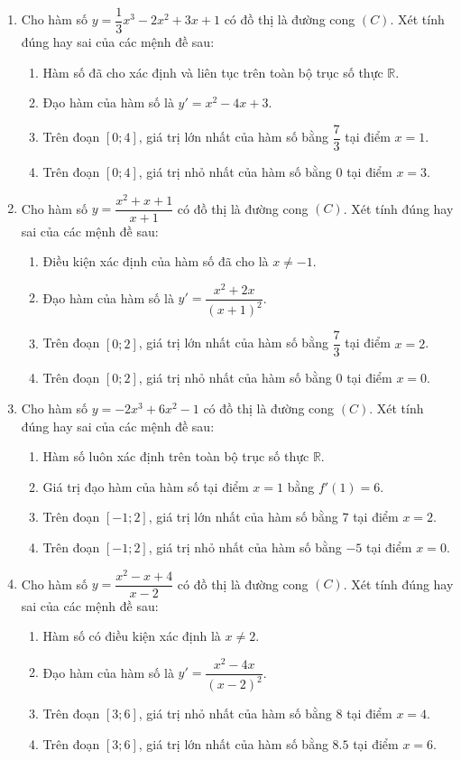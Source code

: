 \documentclass[12pt]{article}
\begin{document}
\begin{enumerate}[label=\textbf{Câu \arabic*.}]
		\item Cho hàm số $y = \dfrac{1}{3}x^3 - 2x^2 + 3x + 1$ có đồ thị là đường cong $(C)$. Xét tính đúng hay sai của các mệnh đề sau:
		\begin{enumerate}[label=\alph*)]
			\item Hàm số đã cho xác định và liên tục trên toàn bộ trục số thực $\mathbb{R}$.
			\item Đạo hàm của hàm số là $y' = x^2 - 4x + 3$.
			\item Trên đoạn $[0; 4]$, giá trị lớn nhất của hàm số bằng $\dfrac{7}{3}$ tại điểm $x = 1$.
			\item Trên đoạn $[0; 4]$, giá trị nhỏ nhất của hàm số bằng $0$ tại điểm $x = 3$.
		\end{enumerate}
		
		\item Cho hàm số $y = \dfrac{x^2 + x + 1}{x + 1}$ có đồ thị là đường cong $(C)$. Xét tính đúng hay sai của các mệnh đề sau:
		\begin{enumerate}[label=\alph*)]
			\item Điều kiện xác định của hàm số đã cho là $x \neq -1$.
			\item Đạo hàm của hàm số là $y' = \dfrac{x^2 + 2x}{(x+1)^2}$.
			\item Trên đoạn $[0; 2]$, giá trị lớn nhất của hàm số bằng $\dfrac{7}{3}$ tại điểm $x = 2$.
			\item Trên đoạn $[0; 2]$, giá trị nhỏ nhất của hàm số bằng $0$ tại điểm $x = 0$.
		\end{enumerate}
		
		\item Cho hàm số $y = -2x^3 + 6x^2 - 1$ có đồ thị là đường cong $(C)$. Xét tính đúng hay sai của các mệnh đề sau:
		\begin{enumerate}[label=\alph*)]
			\item Hàm số luôn xác định trên toàn bộ trục số thực $\mathbb{R}$.
			\item Giá trị đạo hàm của hàm số tại điểm $x = 1$ bằng $f'(1) = 6$.
			\item Trên đoạn $[-1; 2]$, giá trị lớn nhất của hàm số bằng $7$ tại điểm $x = 2$.
			\item Trên đoạn $[-1; 2]$, giá trị nhỏ nhất của hàm số bằng $-5$ tại điểm $x = 0$.
		\end{enumerate}
		
		\item Cho hàm số $y = \dfrac{x^2 - x + 4}{x - 2}$ có đồ thị là đường cong $(C)$. Xét tính đúng hay sai của các mệnh đề sau:
		\begin{enumerate}[label=\alph*)]
			\item Hàm số có điều kiện xác định là $x \neq 2$.
			\item Đạo hàm của hàm số là $y' = \dfrac{x^2 - 4x}{(x-2)^2}$.
			\item Trên đoạn $[3; 6]$, giá trị nhỏ nhất của hàm số bằng $8$ tại điểm $x = 4$.
			\item Trên đoạn $[3; 6]$, giá trị lớn nhất của hàm số bằng $8.5$ tại điểm $x = 6$.
		\end{enumerate}


\end{enumerate}
\end{document}
